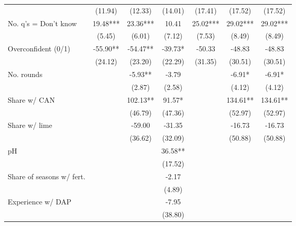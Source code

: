\begin{table}[htbp]
\begin{threeparttable}
\begin{tabular}{l ccc ccc}
                    &     (11.94)   &     (12.33)   &     (14.01)   &     (17.41)   &     (17.52)   &     (17.52)   \\
No. q's = Don't know&       19.48***&       23.36***&       10.41   &       25.02***&       29.02***&       29.02***\\
                    &      (5.45)   &      (6.01)   &      (7.12)   &      (7.53)   &      (8.49)   &      (8.49)   \\
Overconfident (0/1) &      -55.90** &      -54.47** &      -39.73*  &      -50.33   &      -48.83   &      -48.83   \\
                    &     (24.12)   &     (23.20)   &     (22.29)   &     (31.35)   &     (30.51)   &     (30.51)   \\
No. rounds          &               &       -5.93** &       -3.79   &               &       -6.91*  &       -6.91*  \\
                    &               &      (2.87)   &      (2.58)   &               &      (4.12)   &      (4.12)   \\
Share w/ CAN        &               &      102.13** &       91.57*  &               &      134.61** &      134.61** \\
                    &               &     (46.79)   &     (47.36)   &               &     (52.97)   &     (52.97)   \\
Share w/ lime       &               &      -59.00   &      -31.35   &               &      -16.73   &      -16.73   \\
                    &               &     (36.62)   &     (32.09)   &               &     (50.88)   &     (50.88)   \\
pH                  &               &               &       36.58** &               &               &               \\
                    &               &               &     (17.52)   &               &               &               \\
Share of seasons w/ fert.&               &               &       -2.17   &               &               &               \\
                    &               &               &      (4.89)   &               &               &               \\
Experience w/ DAP   &               &               &       -7.95   &               &               &               \\
                    &               &               &     (38.80)   &               &               &               \\

\end{tabular}
\end{threeparttable}
\end{table}
